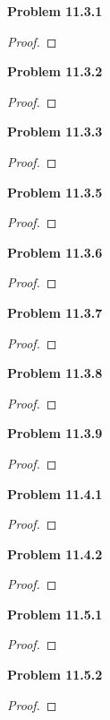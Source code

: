 \documentclass[12pt]{article}
\begin{document}
\textbf{Problem 11.3.1}
\begin{proof}

\end{proof}

\textbf{Problem 11.3.2}
\begin{proof}

\end{proof}

\textbf{Problem 11.3.3}
\begin{proof}

\end{proof}

\textbf{Problem 11.3.5}
\begin{proof}

\end{proof}

\textbf{Problem 11.3.6}
\begin{proof}

\end{proof}

\textbf{Problem 11.3.7}
\begin{proof}

\end{proof}

\textbf{Problem 11.3.8}
\begin{proof}

\end{proof}

\textbf{Problem 11.3.9}
\begin{proof}

\end{proof}

\textbf{Problem 11.4.1}
\begin{proof}

\end{proof}

\textbf{Problem 11.4.2}
\begin{proof}

\end{proof}

\textbf{Problem 11.5.1}
\begin{proof}

\end{proof}

\textbf{Problem 11.5.2}
\begin{proof}

\end{proof}
\end{document}
